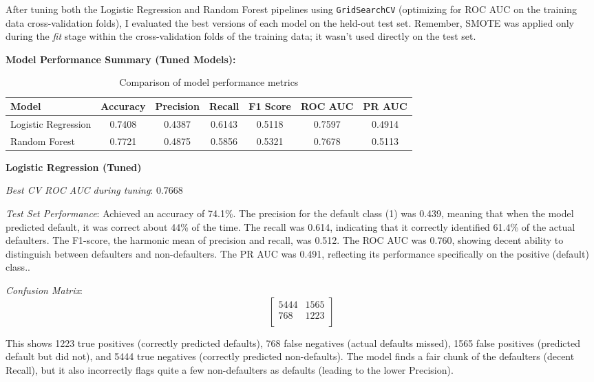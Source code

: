 \documentclass[a4paper,12pt]{article}
\begin{document}
After tuning both the Logistic Regression and Random Forest pipelines using \texttt{GridSearchCV} (optimizing for ROC AUC on the training data cross-validation folds), I evaluated the best versions of each model on the held-out test set. Remember, SMOTE was applied only during the \textit{fit} stage within the cross-validation folds of the training data; it wasn't used directly on the test set.

\textbf{Model Performance Summary (Tuned Models):}

\begin{table}[h!]
\centering
\begin{tabular}{lcccccc}
\hline
\textbf{Model} & \textbf{Accuracy} & \textbf{Precision} & \textbf{Recall} & \textbf{F1 Score} & \textbf{ROC AUC} & \textbf{PR AUC} \\
\hline
Logistic Regression & 0.7408 & 0.4387 & 0.6143 & 0.5118 & 0.7597 & 0.4914 \\
Random Forest        & 0.7721 & 0.4875 & 0.5856 & 0.5321 & 0.7678 & 0.5113 \\
\hline
\end{tabular}
\caption{Comparison of model performance metrics}
\label{tab:model_metrics}
\end{table}

\textbf{Logistic Regression (Tuned)}

\textit{Best CV ROC AUC during tuning}: 0.7668

\textit{Test Set Performance}: Achieved an accuracy of 74.1\%. The precision for the default class (1) was 0.439, meaning that when the model predicted default, it was correct about 44\% of the time. The recall was 0.614, indicating that it correctly identified 61.4\% of the actual defaulters. The F1-score, the harmonic mean of precision and recall, was 0.512. The ROC AUC was 0.760, showing decent ability to distinguish between defaulters and non-defaulters. The PR AUC was 0.491, reflecting its performance specifically on the positive (default) class..

\textit{Confusion Matrix}:
\[
\begin{bmatrix}
5444 & 1565 \\
768 & 1223 \\
\end{bmatrix}
\]

This shows 1223 true positives (correctly predicted defaults), 768 false negatives (actual defaults missed), 1565 false positives (predicted default but did not), and 5444 true negatives (correctly predicted non-defaults). The model finds a fair chunk of the defaulters (decent Recall), but it also incorrectly flags quite a few non-defaulters as defaults (leading to the lower Precision).
\end{document}
